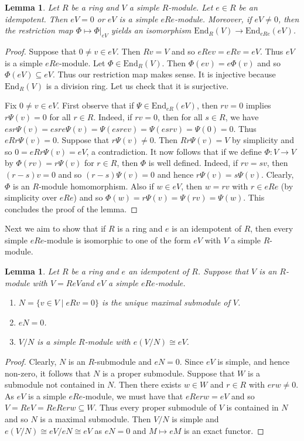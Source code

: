 \documentclass[11pt,reqno]{amsart}
\theoremstyle{plain}
\newtheorem{lem}[thm]{Lemma}
\numberwithin{equation}{section}
\begin{document}
\begin{lem}\label{l:goto.corner}
Let $R$ be a ring and $V$ a simple $R$-module.  Let $e\in R$ be an idempotent.  Then $eV=0$ or $eV$ is a simple $eRe$-module.  Moreover, if $eV\neq 0$, then the restriction map $\Phi\mapsto \Phi|_{eV}$ yields an isomorphism $\mathrm{End}_R(V)\to \mathrm{End}_{eRe}(eV)$.
\end{lem}
\begin{proof}
Suppose that $0\neq v\in eV$.  Then $Rv=V$ and so $eRev=eRv=eV$.  Thus $eV$ is a simple $eRe$-module.  Let $\Phi\in \mathrm{End}_R(V)$.  Then $\Phi(ev) = e\Phi(v)$ and so $\Phi(eV)\subseteq eV$.  Thus our restriction map  makes sense.  It is injective because $\mathrm{End}_R(V)$ is a division ring.  Let us check that it is surjective.

Fix $0\neq v\in eV$. First observe that if $\Psi\in \mathrm{End}_{eR}(eV)$, then $rv=0$ implies $r\Psi(v)=0$ for all $r\in R$.  Indeed, if $rv=0$, then for all $s\in R$, we have $esr\Psi(v) = esre\Psi(v)=\Psi(esrev)=\Psi(esrv)=\Psi(0)=0$.  Thus $eRr\Psi(v)=0$.    Suppose that $r\Psi(v)\neq 0$.  Then $Rr\Psi(v)=V$ by simplicity and so $0=eRr\Psi(v)=eV$, a contradiction.  It now follows that if we define $\Phi\colon V\to V$ by $\Phi(rv) = r\Psi(v)$ for $r\in R$, then $\Phi$ is well defined.  Indeed, if $rv=sv$, then $(r-s)v=0$ and so $(r-s)\Psi(v)=0$ and hence $r\Psi(v)=s\Psi(v)$.  Clearly, $\Phi$ is an $R$-module homomorphism.  Also if $w\in eV$, then $w=rv$ with $r\in eRe$ (by simplicity over $eRe$) and so $\Phi(w) = r\Psi(v) = \Psi(rv)=\Psi(w)$.  This concludes the proof of the lemma.
\end{proof}

Next we aim to show that if $R$ is a ring and $e$ is an idempotent of $R$, then every simple $eRe$-module is isomorphic to one of the form $eV$ with $V$ a simple $R$-module.

\begin{lem}\label{l:find.simple.help}
Let $R$ be a ring and $e$ an idempotent of $R$.  Suppose that $V$ is an $R$-module with $V=ReV$and $eV$ a simple $eRe$-module.
\begin{enumerate}
\item $N=\{v\in V\mid eRv=0\}$ is the unique maximal submodule of $V$.
\item $eN=0$.
\item $V/N$ is a simple $R$-module with $e(V/N)\cong eV$.
\end{enumerate}
\end{lem}
\begin{proof}
 Clearly, $N$ is an $R$-submodule and $eN=0$. Since $eV$ is simple, and hence non-zero, it follows that $N$ is a proper submodule.   Suppose that $W$ is a submodule not contained in $N$.  Then there exists $w\in W$ and $r\in R$ with $erw\neq 0$.  As $eV$ is a simple $eRe$-module, we must have that $eRerw=eV$ and so $V=ReV=ReRerw\subseteq W$.  Thus every proper submodule of $V$ is contained in $N$ and so $N$ is a maximal submodule.  Then $V/N$ is simple and
 $e(V/N)\cong eV/eN\cong eV$ as $eN=0$ and $M\mapsto eM$ is an exact functor.
 \end{proof}
\end{document}
